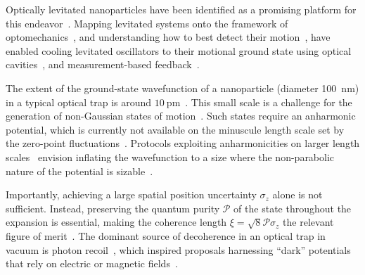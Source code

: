 \documentclass[aps,prl,reprint,twocolumn,superscriptaddress]{revtex4-2}
\begin{document}
Optically levitated nanoparticles have been identified as a promising platform for this endeavor~\cite{romero2011quantumsuperposition,Romero-Isart2011largeQuantum_PRL,Bateman2014near-fieldNatComm,Wan2016PRLfreeNano,Nimmrichter2025electron-enabled,Bykov2025nanoparticlePRL}.
Mapping levitated systems onto the framework of optomechanics~\cite{Romero-Isart2011opticallyLevitating,Chang2010cavityoptomechanics,Aspelmeyer2014cavityRMP}, and understanding how to best detect their motion~\cite{tebbenjohanns2019optimal,Tebbenjohanns2020sideband}, 
have enabled cooling levitated oscillators to their motional ground state using optical cavities~\cite{delic2020cooling,piotrowski2023simultaneous,Ranfagni2022twodimensional}, and measurement-based feedback~\cite{magrini2021realtime,tebbenjohanns2021quantum,Kamba2022optical}.

The extent of the ground-state wavefunction of a nanoparticle (diameter \SI{100}{\nano\meter}) in a typical optical trap is around $\SI{10}{\pico\meter}$~\cite{magrini2021realtime,tebbenjohanns2021quantum}.
This small scale is a challenge for the generation of non-Gaussian states of motion~\cite{romero2011quantumsuperposition,Romero-Isart2011largeQuantum_PRL}. Such states require an anharmonic potential, which is currently not available on the minuscule length scale set by the zero-point fluctuations~\cite{gonzalez2021levitodynamics}.
Protocols exploiting anharmonicities on larger length scales~\cite{rodallordes2024macroscopic,romero2017coherent,neumeier2024fast} envision inflating the wavefunction to a size where the non-parabolic nature of the potential is sizable~\cite{romero2017coherent,Weiss2021largequantum,neumeier2024fast,Cosco2021enhancedPRA}. 

Importantly, achieving a large spatial position uncertainty $\sigma_z$ alone is not sufficient. Instead, preserving the quantum purity $\mathcal{P}$ of the state throughout the expansion is essential, making the coherence length $\xi = \sqrt{8}\mathcal{P}\sigma_z$ the relevant figure of merit~\cite{romero2011quantumsuperposition,romero2017coherent}.
The dominant source of decoherence in an optical trap in vacuum is photon recoil~\cite{Jain2016direct}, which inspired proposals harnessing ``dark'' potentials that rely on electric or magnetic fields~\cite{rodallordes2024macroscopic,Pino2018on-chipQuantum}.
\end{document}
